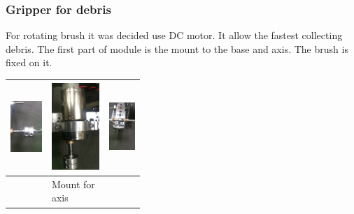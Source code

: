 \subsubsection{Gripper for debris}
For rotating brush it was decided use DC motor. It allow the fastest collecting debris. \newline
The first part of module is the mount to the base and axis. The brush is fixed on it.
	\begin{center}
		\begin{tabular}{|p{0.14\linewidth}|p{0.12\linewidth}|p{0.12\linewidth}|}
			{\includegraphics[scale=0.5]{days_L/Gripper/images/01}} & {\includegraphics[scale=0.5]{days_L/Gripper/images/02}} & {\includegraphics[scale=0.5]{days_L/Gripper/images/03}}\\
			\hline & Mount for axis  &
		\end{tabular}
	\end{center}
